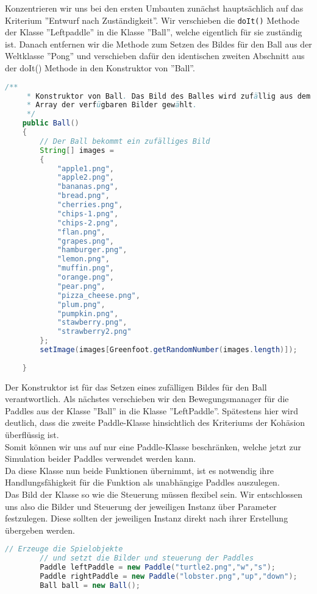 \documentclass{pi1}
\begin{document}
Konzentrieren wir uns bei den ersten Umbauten zunächst hauptsächlich auf das Kriterium ''Entwurf nach Zuständigkeit''.\newline
Wir verschieben die \texttt{doIt()} Methode der Klasse ''Leftpaddle'' in die Klasse ''Ball'', welche eigentlich für sie zuständig ist. Danach entfernen wir die Methode zum Setzen des Bildes für den Ball aus der Weltklasse ''Pong'' und verschieben dafür den identischen zweiten Abschnitt aus der doIt() Methode in den Konstruktor von ''Ball''.
\begin{lstlisting}[caption={Konstruktor von Ball}, firstnumber=17, language=Java]
/**
     * Konstruktor von Ball. Das Bild des Balles wird zufällig aus dem
     * Array der verfügbaren Bilder gewählt.
     */
    public Ball()
    {
        // Der Ball bekommt ein zufälliges Bild
        String[] images =
        {
            "apple1.png",
            "apple2.png",
            "bananas.png",
            "bread.png",
            "cherries.png",
            "chips-1.png",
            "chips-2.png",
            "flan.png",
            "grapes.png",
            "hamburger.png",
            "lemon.png",
            "muffin.png",
            "orange.png",
            "pear.png",
            "pizza_cheese.png",
            "plum.png",
            "pumpkin.png",
            "stawberry.png",
            "strawberry2.png"
        };
        setImage(images[Greenfoot.getRandomNumber(images.length)]);
    
    }
\end{lstlisting}

Der Konstruktor ist für das Setzen eines zufälligen Bildes für den Ball verantwortlich.
Als nächstes verschieben wir den Bewegungsmanager für die Paddles aus der Klasse ''Ball'' in die Klasse ''LeftPaddle''. Spätestens hier wird deutlich, dass die zweite Paddle-Klasse hinsichtlich des Kriteriums der Kohäsion überflüssig ist.\\
Somit können wir uns auf nur eine Paddle-Klasse beschränken, welche jetzt zur Simulation beider Paddles verwendet werden kann.\\

Da diese Klasse nun beide Funktionen übernimmt, ist es notwendig ihre Handlungsfähigkeit für die Funktion als unabhängige Paddles auszulegen.
\\
Das Bild der Klasse so wie die Steuerung müssen flexibel sein.
Wir entschlossen uns also die Bilder und Steuerung der jeweiligen Instanz über Parameter festzulegen. Diese sollten der jeweiligen Instanz direkt nach ihrer Erstellung übergeben werden.
\begin{lstlisting}[caption={Ausschnitt der Weltenklasse Pong}, firstnumber=17, language=Java]
// Erzeuge die Spielobjekte
        // und setzt die Bilder und steuerung der Paddles
        Paddle leftPaddle = new Paddle("turtle2.png","w","s");
        Paddle rightPaddle = new Paddle("lobster.png","up","down");
        Ball ball = new Ball();
    
\end{lstlisting}
\end{document}
